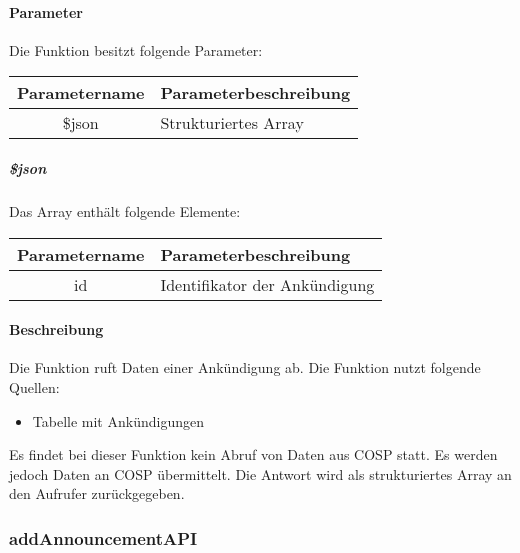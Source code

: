 \paragraph{Parameter} Die Funktion besitzt folgende Parameter:
\begin{table}[H]
	\begin{tabular}{|c|p{11cm}|}
		\hline
		\textbf{Parametername} & \textbf{Parameterbeschreibung} \\ \hline
		\$json & Strukturiertes Array \\ \hline
	\end{tabular}
\end{table}
\subparagraph{\$json}Das Array enthält folgende Elemente:
\begin{table}[H]
	\begin{tabular}{|c|p{11cm}|}
		\hline
		\textbf{Parametername} & \textbf{Parameterbeschreibung} \\ \hline
		id   & Identifikator der Ankündigung \\ \hline
	\end{tabular}
\end{table}
\paragraph{Beschreibung} Die Funktion ruft Daten einer Ankündigung ab. Die Funktion nutzt folgende Quellen:
\begin{itemize}
	\item Tabelle mit Ankündigungen
\end{itemize}
Es findet bei dieser Funktion kein Abruf von Daten aus {\glqq COSP\grqq} statt. Es werden jedoch Daten an {\glqq COSP\grqq} übermittelt. Die Antwort wird als strukturiertes Array an den Aufrufer zurückgegeben.
\subsubsection{addAnnouncementAPI}
